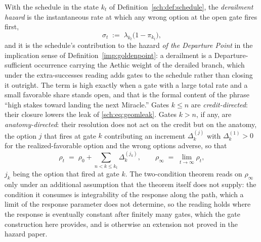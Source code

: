 \begin{definition}\label{sch:def:derailment}
With the schedule in the state $k_t$ of Definition~\ref{sch:def:schedule},
the \emph{derailment hazard} is the instantaneous rate at which any
wrong option at the open gate fires first,
\begin{equation}\label{sch:eq:derailment}
\sigma_t\;:=\;\lambda_{k_t}\bigl(1-\pi_{k_t}\bigr),
\end{equation}
and it is the schedule's contribution to the hazard \emph{of the
Departure Point} in the implication sense of
Definition~\ref{imp:goldenpoint}: a derailment is a Departure-sufficient
occurrence carrying the Aethic weight of the derailed branch, which
under the extra-successes reading adds gates to the schedule rather
than closing it outright. The term is high exactly when a gate with a
large total rate and a small favorable share stands open, and that is
the formal content of the phrase ``high stakes toward landing the next
Miracle.'' Gates $k\le n$ are \emph{credit-directed}: their closure
lowers the leak of \eqref{sch:eq:geomleak}. Gates $k>n$, if any, are
\emph{anatomy-directed}: their resolution does not act on the credit
but on the anatomy, the option $j$ that fires at gate $k$ contributing
an increment $\Delta_{k}^{(j)}$ with $\Delta_{k}^{(1)}>0$ for the
realized-favorable option and the wrong options adverse, so that
\begin{equation}\label{sch:eq:rhoprocess}
\rho_t\;=\;\rho_0+\sum_{n<k\le k_t}\Delta_{k}^{(j_k)},
\qquad
\rho_\infty\;=\;\lim_{t\to\infty}\rho_t,
\end{equation}
$j_k$ being the option that fired at gate $k$. The two-condition theorem reads on $\rho_\infty$ only under an additional assumption that the theorem itself does not supply: the condition it consumes is integrability of the response along the path, which a limit of the response parameter does not determine, so the reading holds where the response is eventually constant after finitely many gates, which the gate construction here provides, and is otherwise an extension not proved in the hazard paper.
\end{definition}

